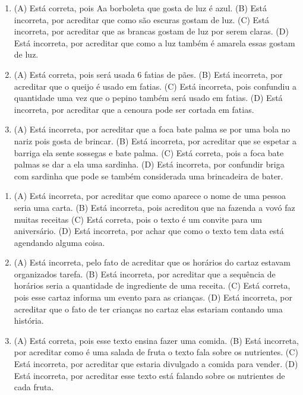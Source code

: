 
\begin{enumerate}
\item
(A) Está correta, pois Aa borboleta que gosta de luz é azul.
(B) Está incorreta, por acreditar que como são escuras gostam de luz.
(C) Está incorreta, por acreditar que as brancas gostam de luz por serem claras.
(D) Está incorreta, por acreditar que como a luz também é amarela essas gostam de luz.

\item
(A) Está correta, pois será usada 6 fatias de pães.
(B) Está incorreta, por acreditar que o queijo é usado em fatias.
(C) Está incorreta, pois confundiu a quantidade uma vez que o pepino também será usado em fatias.
(D) Está incorreta, por acreditar que a cenoura pode ser cortada em fatias.

\item
(A) Está incorreta, por acreditar que a foca bate palma se por uma bola
no nariz pois gosta de brincar.
(B) Está incorreta, por acreditar que se espetar a barriga ela sente
sossegas e bate palma.
(C) Está correta, pois a foca bate palmas se dar a ela uma sardinha.
(D) Está incorreta, por confundir briga com sardinha que pode se também
considerada uma brincadeira de bater.
\end{enumerate}


\begin{enumerate}
\item
(A) Está incorreta, por acreditar que como aparece o nome de uma pessoa seria uma carta.
(B) Está incorreta, pois acreditou que na fazenda a vovó faz muitas receitas
(C) Está correta, pois o texto é um convite para um aniversário.
(D) Está incorreta, por achar que como o texto tem data está agendando alguma coisa.

\item
(A) Está incorreta, pelo fato de acreditar que os horários do cartaz
estavam organizados tarefa.
(B) Está incorreta, por acreditar que a sequência de horários seria a
quantidade de ingrediente de uma receita.
(C) Está correta, pois esse cartaz informa um evento para as crianças.
(D) Está incorreta, por acreditar que o fato de ter crianças no cartaz
elas estariam contando uma história.

\item
(A) Está correta, pois esse texto ensina fazer uma comida.
(B) Está incorreta, por acreditar como é uma salada de fruta o texto fala sobre os nutrientes.
(C) Está incorreta, por acreditar que estaria divulgado a comida para vender.
(D) Está incorreta, por acreditar esse texto está falando sobre os
nutrientes de cada fruta.
\end{enumerate}

